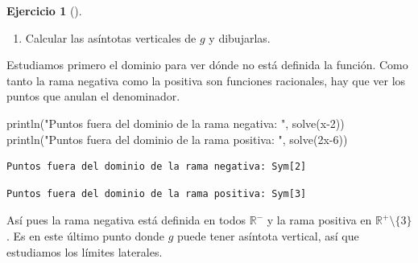 \documentclass[
  a4paper,
]{scrreport}
\newenvironment{Shaded}{\begin{snugshade}}{\end{snugshade}}
\newcommand{\FloatTok}[1]{\textcolor[rgb]{0.68,0.00,0.00}{#1}}
\newcommand{\FunctionTok}[1]{\textcolor[rgb]{0.28,0.35,0.67}{#1}}
\newcommand{\NormalTok}[1]{\textcolor[rgb]{0.00,0.23,0.31}{#1}}
\newcommand{\OperatorTok}[1]{\textcolor[rgb]{0.37,0.37,0.37}{#1}}
\newcommand{\StringTok}[1]{\textcolor[rgb]{0.13,0.47,0.30}{#1}}
\providecommand{\tightlist}{%
  \setlength{\itemsep}{0pt}\setlength{\parskip}{0pt}}\usepackage{longtable,booktabs,array}
\theoremstyle{definition}
\newtheorem{exercise}{Ejercicio}[chapter]
\theoremstyle{remark}
\begin{document}
\begin{exercise}[]
\begin{tcolorbox}
\end{tcolorbox}

\begin{enumerate}
\def\labelenumi{\alph{enumi}.}
\setcounter{enumi}{1}
\tightlist
\item
  Calcular las asíntotas verticales de \(g\) y dibujarlas.
\end{enumerate}

\begin{tcolorbox}[enhanced jigsaw, titlerule=0mm, colframe=quarto-callout-tip-color-frame, opacityback=0, colback=white, toprule=.15mm, breakable, arc=.35mm, title=\textcolor{quarto-callout-tip-color}{\faLightbulb}\hspace{0.5em}{Solución}, bottomtitle=1mm, toptitle=1mm, rightrule=.15mm, bottomrule=.15mm, opacitybacktitle=0.6, coltitle=black, leftrule=.75mm, left=2mm, colbacktitle=quarto-callout-tip-color!10!white]

Estudiamos primero el dominio para ver dónde no está definida la
función. Como tanto la rama negativa como la positiva son funciones
racionales, hay que ver los puntos que anulan el denominador.

\begin{Shaded}
\begin{Highlighting}[]
\FunctionTok{println}\NormalTok{(}\StringTok{"Puntos fuera del dominio de la rama negativa: "}\NormalTok{, }\FunctionTok{solve}\NormalTok{(x}\OperatorTok{{-}}\FloatTok{2}\NormalTok{))}
\FunctionTok{println}\NormalTok{(}\StringTok{"Puntos fuera del dominio de la rama positiva: "}\NormalTok{, }\FunctionTok{solve}\NormalTok{(}\FloatTok{2}\NormalTok{x}\OperatorTok{{-}}\FloatTok{6}\NormalTok{))}
\end{Highlighting}
\end{Shaded}

\begin{verbatim}
Puntos fuera del dominio de la rama negativa: Sym[2]
\end{verbatim}

\begin{verbatim}
Puntos fuera del dominio de la rama positiva: Sym[3]
\end{verbatim}

Así pues la rama negativa está definida en todos \(\mathbb{R}^-\) y la
rama positiva en \(\mathbb{R}^+\setminus\{3\}\). Es en este último punto
donde \(g\) puede tener asíntota vertical, así que estudiamos los
límites laterales.


\end{tcolorbox}
\end{exercise}
\end{document}
